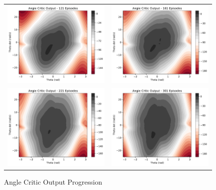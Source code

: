 \begin{figure}[H]
\begin{tabular}{cc}
		\includegraphics[width=65mm]{figures/train_figs/angle_critic/Critic0_121.pdf} &   \includegraphics[width=65mm]{figures/train_figs/angle_critic/Critic0_161.pdf} \\
		\includegraphics[width=65mm]{figures/train_figs/angle_critic/Critic0_221.pdf} &   \includegraphics[width=65mm]{figures/train_figs/angle_critic/Critic0_301.pdf} \\
	\end{tabular}
	\caption{Angle Critic Output Progression}\label{fig:angle_critic_contour}
\end{figure}

